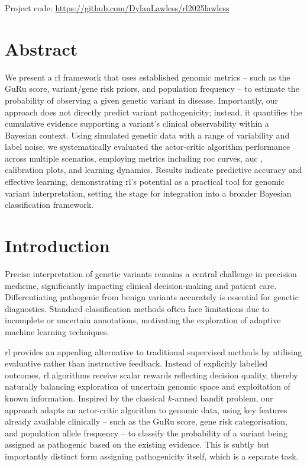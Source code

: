 \vfill
\noindent Project code: \href{https://github.com/DylanLawless/rl2025lawless}{https://github.com/DylanLawless/rl2025lawless}

\clearpage
 

\section*{Abstract}

We present a \ac{rl} framework that uses established genomic metrics -- such as the GuRu score, variant/gene risk priors, and population frequency -- to estimate the probability of observing a given genetic variant in disease. Importantly, our approach does not directly predict variant pathogenicity; instead, it quantifies the cumulative evidence supporting a variant’s clinical observability within a Bayesian context. Using simulated genetic data with a range of variability and label noise, we systematically evaluated the actor-critic algorithm performance across multiple scenarios, employing metrics including \ac{roc} curves, \ac{auc} , calibration plots, and learning dynamics. Results indicate predictive accuracy and effective learning, demonstrating \ac{rl}’s potential as a practical tool for genomic variant interpretation, setting the stage for integration into a broader Bayesian classification framework.


\section{Introduction}
Precise interpretation of genetic variants remains a central challenge in precision medicine, significantly impacting clinical decision-making and patient care. Differentiating pathogenic from benign variants accurately is essential for genetic diagnostics. Standard classification methods often face limitations due to incomplete or uncertain annotations, motivating the exploration of adaptive machine learning techniques.

\ac{rl} provides an appealing alternative to traditional supervised methods by utilising evaluative rather than instructive feedback. Instead of explicitly labelled outcomes, \ac{rl} algorithms receive scalar rewards reflecting decision quality, thereby naturally balancing exploration of uncertain genomic space and exploitation of known information. Inspired by the classical $k$-armed bandit problem, our approach adapts an actor-critic algorithm to genomic data, using key features already available clinically -- such as the GuRu score, gene risk categorisation, and population allele frequency -- to classify the probability of a variant being assigned as pathogenic based on the existing evidence.
This is subtly but importantly distinct form assigning pathogenicity itself, which is a separate task.

